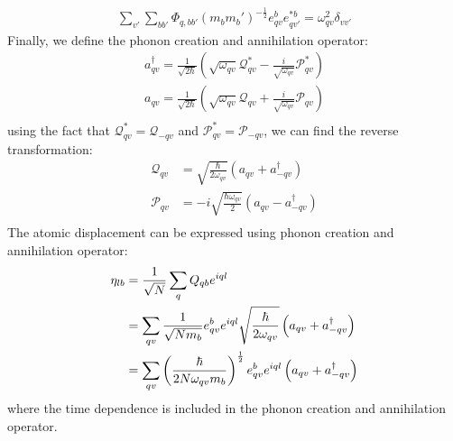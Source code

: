 \documentclass{article}
\begin{document}
\begin{align}
    \sum_{v'} \sum_{bb'} \Phi_{q,bb'} (m_b m_b')^{-\frac{1}{2}} e_{qv}^b e_{qv'}^{*b} = \omega^2_{qv}\delta_{vv'}
\end{align}
Finally, we define the phonon creation and annihilation operator:
\begin{align}
    a^{\dagger}_{qv} = \frac{1}{\sqrt{2\hbar}} \left( \sqrt{\omega_{qv}} \mathcal{Q}^*_{qv} - \frac{i}{\sqrt{\omega_{qv}}}\mathcal{P}^*_{qv} \right) \\
    a_{qv} = \frac{1}{\sqrt{2\hbar}} \left( \sqrt{\omega_{qv}} \mathcal{Q}_{qv} + \frac{i}{\sqrt{\omega_{qv}}}\mathcal{P}_{qv} \right) \\
\end{align}
using the fact that $\mathcal{Q}^*_{qv} = \mathcal{Q}_{-qv}$ and $\mathcal{P}^*_{qv} = \mathcal{P}_{-qv}$, we can find the reverse transformation:
\begin{align}
    \mathcal{Q}_{qv} &= \sqrt{\frac{\hbar}{2\omega_{qv}}} \left( a_{qv} + a^{\dagger}_{-qv} \right) \\
    \mathcal{P}_{qv} &= -i \sqrt{\frac{\hbar\omega_{qv}}{2}} \left( a_{qv} - a^{\dagger}_{-qv} \right) \\
\end{align}
The atomic displacement can be expressed using phonon creation and annihilation operator:
\begin{align}
    \eta_{lb} &= \frac{1}{\sqrt{N}} \sum_{q} Q_{qb} e^{iql} \notag \\
             &= \sum_{qv} \frac{1}{\sqrt{Nm_b}} e_{qv}^b e^{iql} \sqrt{\frac{\hbar}{2\omega_{qv}}} \left( a_{qv} + a^{\dagger}_{-qv} \right) \notag \\
             &= \sum_{qv} \left(\frac{\hbar}{2N\omega_{qv}m_b}\right)^{\frac{1}{2}} e_{qv}^b e^{iql} \left( a_{qv} + a^{\dagger}_{-qv} \right) \label{displacement}
\end{align}
where the time dependence is included in the phonon creation and annihilation operator.
\end{document}

